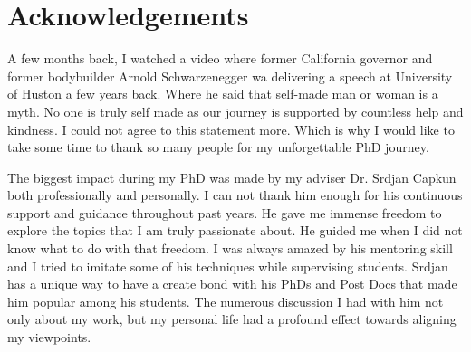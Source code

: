 
\bigskip

\begingroup
\let\clearpage\relax
\let\cleardoublepage\relax
\let\cleardoublepage\relax
\chapter*{Acknowledgements}

\def\thanks#1{%
\begingroup
\leftskip1em
\noindent #1
\par
\endgroup
}

A few months back, I watched a video where former California governor and former bodybuilder Arnold Schwarzenegger wa delivering a speech at University of Huston a few years back. Where he said that self-made man or woman is a myth. No one is truly self made as our journey is supported by countless help and kindness. I could not agree to this statement more. Which is why I would like to take some time to thank so many people for my unforgettable PhD journey.

The biggest impact during my PhD was made by my adviser Dr. Srdjan Capkun both professionally and personally. I can not thank him enough for his continuous support and guidance throughout past years. He gave me immense freedom to explore the topics that I am truly passionate about. He guided me when I did not know what to do with that freedom. I was always amazed by his mentoring skill and I tried to imitate some of his techniques while supervising students. Srdjan has a unique way to have a create bond with his PhDs and Post Docs that made him popular among his students. The numerous discussion I had with him not only about my work, but my personal life had a profound effect towards aligning my viewpoints. %



\endgroup
